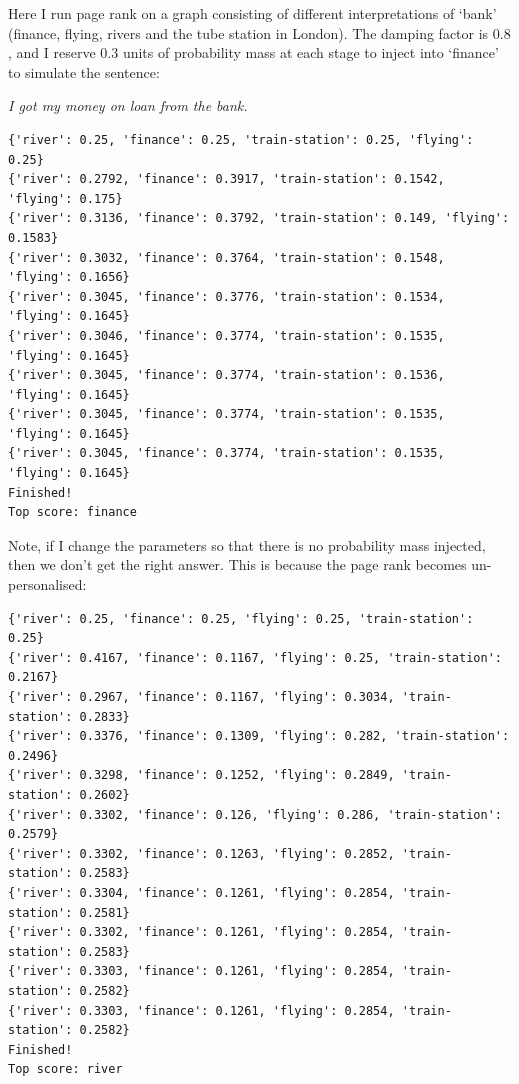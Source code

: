 Here I run page rank on a graph consisting of different interpretations of
`bank' (finance, flying, rivers and the tube station in London). The damping
factor is $0.8$, and I reserve $0.3$ units of probability mass at each stage to
inject into `finance' to simulate the sentence:

\textit{I got my money on loan from the bank.}

\begin{verbatim}
{'river': 0.25, 'finance': 0.25, 'train-station': 0.25, 'flying': 0.25}
{'river': 0.2792, 'finance': 0.3917, 'train-station': 0.1542, 'flying': 0.175}
{'river': 0.3136, 'finance': 0.3792, 'train-station': 0.149, 'flying': 0.1583}
{'river': 0.3032, 'finance': 0.3764, 'train-station': 0.1548, 'flying': 0.1656}
{'river': 0.3045, 'finance': 0.3776, 'train-station': 0.1534, 'flying': 0.1645}
{'river': 0.3046, 'finance': 0.3774, 'train-station': 0.1535, 'flying': 0.1645}
{'river': 0.3045, 'finance': 0.3774, 'train-station': 0.1536, 'flying': 0.1645}
{'river': 0.3045, 'finance': 0.3774, 'train-station': 0.1535, 'flying': 0.1645}
{'river': 0.3045, 'finance': 0.3774, 'train-station': 0.1535, 'flying': 0.1645}
Finished!
Top score: finance
\end{verbatim}

Note, if I change the parameters so that there is no probability mass injected,
then we don't get the right answer. This is because the page rank becomes un-
personalised:

\begin{verbatim}
{'river': 0.25, 'finance': 0.25, 'flying': 0.25, 'train-station': 0.25}
{'river': 0.4167, 'finance': 0.1167, 'flying': 0.25, 'train-station': 0.2167}
{'river': 0.2967, 'finance': 0.1167, 'flying': 0.3034, 'train-station': 0.2833}
{'river': 0.3376, 'finance': 0.1309, 'flying': 0.282, 'train-station': 0.2496}
{'river': 0.3298, 'finance': 0.1252, 'flying': 0.2849, 'train-station': 0.2602}
{'river': 0.3302, 'finance': 0.126, 'flying': 0.286, 'train-station': 0.2579}
{'river': 0.3302, 'finance': 0.1263, 'flying': 0.2852, 'train-station': 0.2583}
{'river': 0.3304, 'finance': 0.1261, 'flying': 0.2854, 'train-station': 0.2581}
{'river': 0.3302, 'finance': 0.1261, 'flying': 0.2854, 'train-station': 0.2583}
{'river': 0.3303, 'finance': 0.1261, 'flying': 0.2854, 'train-station': 0.2582}
{'river': 0.3303, 'finance': 0.1261, 'flying': 0.2854, 'train-station': 0.2582}
Finished!
Top score: river
\end{verbatim}